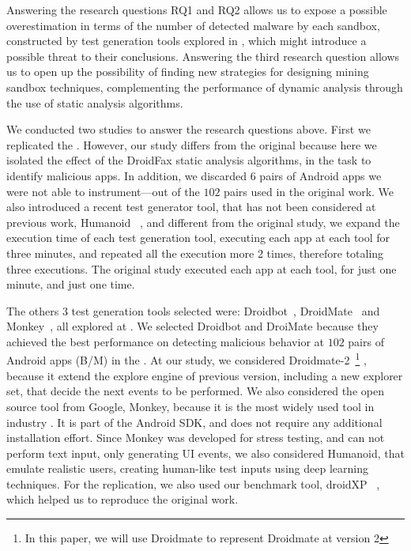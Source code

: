 Answering the research questions RQ1 and RQ2 allows us to expose a possible overestimation in terms of the number of detected malware by each sandbox, constructed by test generation tools explored in \blls
, which might introduce a possible threat to their conclusions. Answering the third research question
allows us to open up the possibility of finding new strategies for designing mining sandbox techniques, complementing the performance of
dynamic analysis through the use of static analysis algorithms.

We conducted two studies to answer the research questions above. First we replicated the \blls. However, our study differs from the original because here we isolated the effect of the DroidFax static analysis algorithms, in the task to identify malicious apps. In addition, we discarded $6$ pairs of
Android apps we were not able to instrument---out of the $102$ pairs used in the original work. We also introduced a recent test generator tool, that has not been considered at previous work, Humanoid ~\cite{DBLP:conf/kbse/LiY0C19}, and different from the original study, we expand the execution time of each test generation tool, executing each app at each tool for three minutes, and repeated all the execution more 2 times, therefore totaling three executions. The original study executed each app at each tool, for just one minute, and just one time.

The others $3$ test generation tools selected were: Droidbot~\cite{DBLP:conf/icse/LiYGC17},
DroidMate~\cite{DBLP:conf/icse/JamrozikZ16} and Monkey~\cite{Monkey}, all explored at \blls. We selected Droidbot and DroiMate because they achieved
the best performance on detecting malicious behavior at $102$ pairs of Android apps (B/M) in the \blls. At our study, we considered Droidmate-2~\footnote{In this paper, we will use Droidmate to represent Droidmate at version 2} \cite{DBLP:conf/kbse/BorgesHZ18}, because it extend the explore engine of previous version, including a new explorer set, that decide the next events to be performed. We also considered the open source tool from Google, Monkey, because it is the most widely used tool in industry \cite{DBLP:conf/sigsoft/ZengLZXDLYX16}. It is part of the Android SDK, and does not require any additional installation effort. Since Monkey was developed for stress testing, and can not perform text input, only generating
UI events, we also considered Humanoid, that emulate realistic users, creating human-like test inputs using deep learning techniques.
For the replication, we also used our benchmark tool, droidXP ~\cite{DBLP:conf/scam/CostaMCMVBC20},
which helped us to reproduce the original work.

